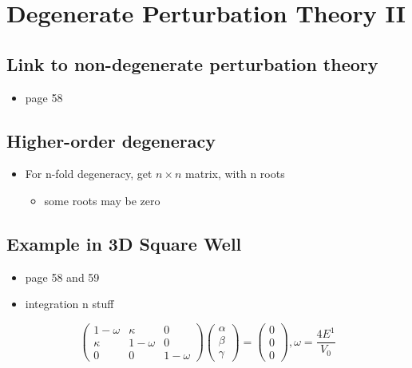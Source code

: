 \documentclass[a4paper,11pt,normalem]{article}
\begin{document}
\section{Degenerate Perturbation Theory II}\label{degenerate-perturbation-theory-ii}

\subsection{Link to non-degenerate perturbation theory}\label{link-to-non-degenerate-perturbation-theory}

\begin{itemize}
\item
  page 58
\end{itemize}

\subsection{Higher-order degeneracy}\label{higher-order-degeneracy}

\begin{itemize}
\item
  For n-fold degeneracy, get \(n \times n\) matrix, with n roots
  \begin{itemize}
  \item
    some roots may be zero
  \end{itemize}
\end{itemize}

\subsection{Example in 3D Square Well}\label{example-in-3d-square-well}

\begin{itemize}
\item
  page 58 and 59
\item
  integration n stuff
\end{itemize}

\[
    \begin{pmatrix} 1 - \omega & \kappa & 0 \\ \kappa & 1 - \omega & 0 \\ 0 & 0 & 1 - \omega \end{pmatrix} \begin{pmatrix} \alpha \\ \beta \\ \gamma \end{pmatrix} = \begin{pmatrix} 0 \\ 0 \\ 0 \end{pmatrix}, \omega = \frac{4E^1}{V_0}
\]
\end{document}
